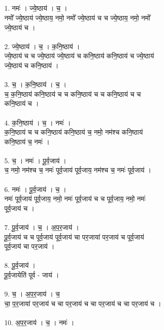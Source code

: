 \subsection{}
1. नमः॑ । ज्ये॒ष्ठाय॑ । च॒ ।\\
नमो᳚ ज्ये॒ष्ठाय॑ ज्ये॒ष्ठाय॒ नमो॒ नमो᳚ ज्ये॒ष्ठाय॑ च च ज्ये॒ष्ठाय॒ नमो॒ नमो᳚\\
ज्ये॒ष्ठाय॑ च ।\\
\\
2. ज्ये॒ष्ठाय॑ । च॒ । क॒नि॒ष्ठाय॑ ।\\
ज्ये॒ष्ठाय॑ च च ज्ये॒ष्ठाय॑ ज्ये॒ष्ठाय॑ च कनि॒ष्ठाय॑ कनि॒ष्ठाय॑ च ज्ये॒ष्ठाय॑\\
ज्ये॒ष्ठाय॑ च कनि॒ष्ठाय॑ ।\\
\\
3. च॒ । क॒नि॒ष्ठाय॑ । च॒ ।\\
च॒ क॒नि॒ष्ठाय॑ कनि॒ष्ठाय॑ च च कनि॒ष्ठाय॑ च च कनि॒ष्ठाय॑ च च\\
कनि॒ष्ठाय॑ च ।\\
\\
4. क॒नि॒ष्ठाय॑ । च॒ । नमः॑ ।\\
क॒नि॒ष्ठाय॑ च च कनि॒ष्ठाय॑ कनि॒ष्ठाय॑ च॒ नमो॒ नम॑श्च कनि॒ष्ठाय॑\\
कनि॒ष्ठाय॑ च॒ नमः॑ ।\\
\\
5. च॒ । नमः॑ । पू॒र्व॒जाय॑ ।\\
च॒ नमो॒ नम॑श्च च॒ नमः॑ पूर्व॒जाय॑ पूर्व॒जाय॒ नम॑श्च च॒ नमः॑ पूर्व॒जाय॑ ।\\
\\
6. नमः॑ । पू॒र्व॒जाय॑ । च॒ ।\\
नमः॑ पूर्व॒जाय॑ पूर्व॒जाय॒ नमो॒ नमः॑ पूर्व॒जाय॑ च च पूर्व॒जाय॒ नमो॒ नमः॑\\
पूर्व॒जाय॑ च ।\\
\\
7. पू॒र्व॒जाय॑ । च॒ । अ॒प॒र॒जाय॑ ।\\
पू॒र्व॒जाय॑ च च पूर्व॒जाय॑ पूर्व॒जाय॑ चा पर॒जाया॑ पर॒जाय॑ च पूर्व॒जाय॑\\
पूर्व॒जाय॑ चा पर॒जाय॑ ।\\
\\
8. पू॒र्व॒जाय॑ ।\\
पू॒र्व॒जायेति॑ पूर्व - जाय॑ ।\\
\\
9. च॒ । अ॒प॒र॒जाय॑ । च॒\\
चा॒ प॒र॒जाया॑ पर॒जाय॑ च चा पर॒जाय॑ च चा पर॒जाय॑ च चा पर॒जाय॑ च ।\\
\\
10. अ॒प॒र॒जाय॑ । च॒ । नमः॑ ।\\
